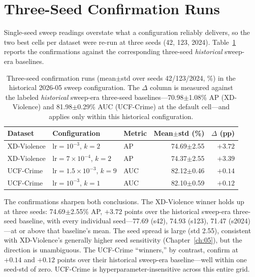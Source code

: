 \section{Three-Seed Confirmation Runs}
\label{sec:appc-confirm}

Single-seed sweep readings overstate what a configuration reliably
delivers, so the two best cells per dataset were re-run at three seeds
(42, 123, 2024). Table~\ref{tab:appc-confirm} reports the confirmations
against the corresponding three-seed \emph{historical} sweep-era baselines.

\begin{table}[t]
\centering
\caption{Three-seed confirmation runs (mean$\pm$std over seeds 42/123/2024,
\%) in the historical 2026-05 sweep configuration. The $\Delta$ column is
measured against the labeled \emph{historical} sweep-era three-seed
baselines---70.98$\pm$1.08\% AP (XD-Violence) and 81.98$\pm$0.29\% AUC
(UCF-Crime) at the default cell---and applies only within this historical
configuration.}
\label{tab:appc-confirm}
\begin{tabular}{lllrr}
\toprule
Dataset & Configuration & Metric & Mean$\pm$std (\%) & $\Delta$ (pp) \\
\midrule
XD-Violence & $\mathrm{lr}=10^{-3}$, $k=2$ & AP & 74.69$\pm$2.55 & $+3.72$ \\
XD-Violence & $\mathrm{lr}=7\times10^{-4}$, $k=2$ & AP & 74.37$\pm$2.55 & $+3.39$ \\
UCF-Crime & $\mathrm{lr}=1.5\times10^{-3}$, $k=9$ & AUC & 82.12$\pm$0.46 & $+0.14$ \\
UCF-Crime & $\mathrm{lr}=10^{-3}$, $k=1$ & AUC & 82.10$\pm$0.59 & $+0.12$ \\
\bottomrule
\end{tabular}
\end{table}

The confirmations sharpen both conclusions. The XD-Violence winner holds up
at three seeds: 74.69$\pm$2.55\% AP, $+3.72$ points over the historical
sweep-era three-seed baseline, with every individual seed---77.69 (s42),
74.93 (s123), 71.47 (s2024)---at or above that baseline's mean. The seed
spread is large (std 2.55), consistent with XD-Violence's generally higher
seed sensitivity (Chapter~\ref{ch:05}), but the direction is unambiguous.
The UCF-Crime ``winners,'' by contrast, confirm at $+0.14$ and $+0.12$
points over their historical sweep-era baseline---well within one seed-std
of zero. UCF-Crime is hyperparameter-insensitive across this entire grid.

